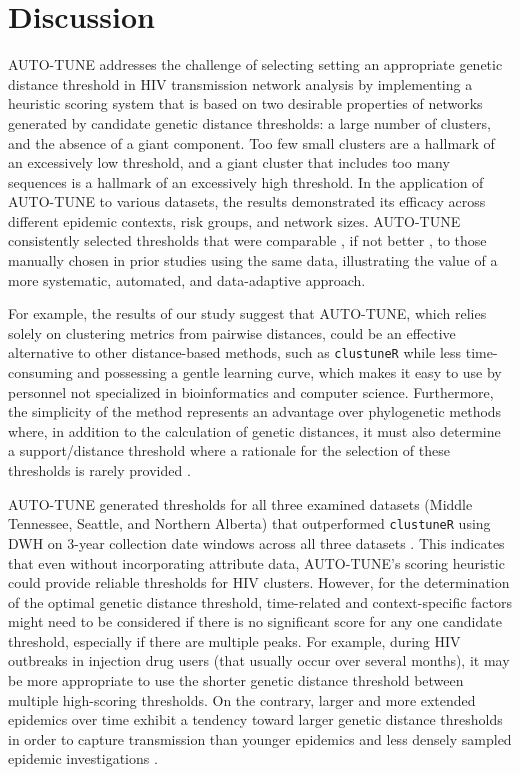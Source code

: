 \documentclass[utf8]{FrontiersinHarvard} %
\newcommand{\TODO}[1]{{\color{red}{#1}}}
\begin{document}

\section{Discussion}

AUTO-TUNE addresses the challenge of selecting setting an appropriate genetic
distance threshold in HIV transmission network analysis by implementing a
heuristic scoring system that is based on two desirable properties of networks generated by
candidate genetic distance thresholds: a large number of clusters, and the absence of a giant component. 
Too few small clusters are a hallmark of an excessively low threshold, and a giant cluster that includes too many sequences is a hallmark of an excessively high threshold.
In the application of AUTO-TUNE to
various datasets, the results demonstrated its efficacy across different
epidemic contexts, risk groups, and network sizes. \TODO{Not sure what efficacy means} AUTO-TUNE consistently
selected thresholds that were comparable \TODO{comparable how?}, if not better \TODO{better how?}, to those manually
chosen in prior studies using the same data, illustrating the value of a more
systematic, automated, and data-adaptive approach.

For example, the results of our study suggest that AUTO-TUNE, which relies
solely on clustering metrics from pairwise distances, could be an effective
alternative to other distance-based methods, such as {\tt clustuneR} while less time-consuming
and possessing a gentle learning curve, which makes it easy to use by
personnel not specialized in bioinformatics and computer science. Furthermore,
the simplicity of the method represents an advantage over phylogenetic methods
where, in addition to the calculation of  genetic distances, it must also determine
a support/distance threshold where a rationale for the selection of these
thresholds is rarely provided \cite{junqueira_factors_2019}.

AUTO-TUNE generated thresholds for all three examined datasets (Middle
Tennessee, Seattle, and Northern Alberta) that outperformed {\tt clustuneR} using DWH
on 3-year collection date windows across all three datasets \TODO{again, need to be clear about why higher DWH is better}. 
This indicates that even without incorporating attribute data, AUTO-TUNE's scoring heuristic
could provide reliable thresholds for HIV clusters. However, for the
determination of the optimal genetic distance threshold, time-related and
context-specific factors might need to be considered if there is no significant
score for any one candidate threshold, especially if there are multiple peaks.
For example, during HIV outbreaks in injection drug users  (that usually occur
over several months), it may be more appropriate to use the shorter genetic
distance threshold \cite{peters_hiv_2016,campbell_detailed_2017} between
multiple high-scoring thresholds. On the contrary, larger and more extended
epidemics over time exhibit a tendency toward larger genetic distance
thresholds in order to capture transmission than younger epidemics and less
densely sampled epidemic investigations
\cite{patil_exploring_2022,leung_molecular_2019,di_giallonardo_subtype-specific_2021}.
\end{document}

